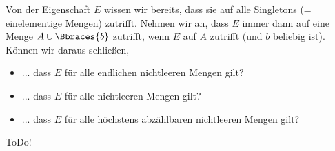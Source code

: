 
\begin{exercise}[2]

Von der Eigenschaft $E$ wissen wir bereits, dass sie auf alle Singletons (= einelementige Mengen) zutrifft.
Nehmen wir an, dass $E$ immer dann auf eine Menge $A \cup \Bbraces{b}$ zutrifft, wenn $E$ auf $A$ zutrifft (und $b$ beliebig ist).
Können wir daraus schließen,

\begin{itemize}
    \item ... dass $E$ für alle endlichen nichtleeren Mengen gilt?
    \item ... dass $E$ für alle nichtleeren Mengen gilt?
    \item ... dass $E$ für alle höchstens abzählbaren nichtleeren Mengen gilt?
\end{itemize}

\end{exercise}


\begin{solution}

ToDo!

\end{solution}

